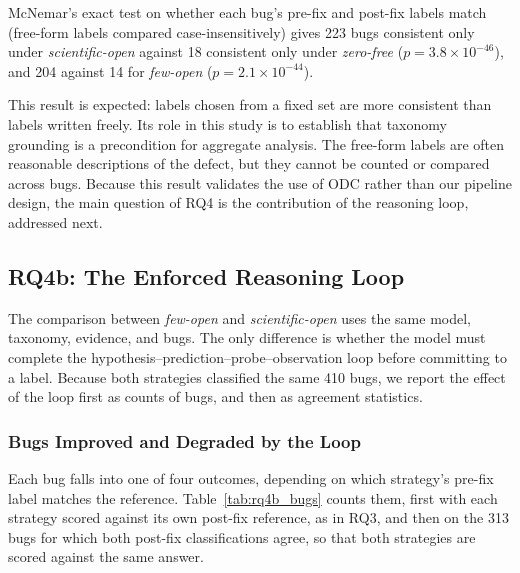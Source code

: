 \documentclass{iutbscthesis}
\begin{document}
McNemar's exact test on whether each bug's pre-fix and post-fix labels match (free-form labels compared case-insensitively) gives 223 bugs consistent only under \textit{scientific-open} against 18 consistent only under \textit{zero-free} ($p = 3.8 \times 10^{-46}$), and 204 against 14 for \textit{few-open} ($p = 2.1 \times 10^{-44}$).

This result is expected: labels chosen from a fixed set are more consistent than labels written freely. Its role in this study is to establish that taxonomy grounding is a precondition for aggregate analysis. The free-form labels are often reasonable descriptions of the defect, but they cannot be counted or compared across bugs. Because this result validates the use of ODC rather than our pipeline design, the main question of RQ4 is the contribution of the reasoning loop, addressed next.

\subsection{RQ4b: The Enforced Reasoning Loop}
\label{sec:rq4b}

The comparison between \textit{few-open} and \textit{scientific-open} uses the same model, taxonomy, evidence, and bugs. The only difference is whether the model must complete the hypothesis--prediction--probe--observation loop before committing to a label. Because both strategies classified the same 410 bugs, we report the effect of the loop first as counts of bugs, and then as agreement statistics.

\subsubsection{Bugs Improved and Degraded by the Loop}

Each bug falls into one of four outcomes, depending on which strategy's pre-fix label matches the reference. Table~\ref{tab:rq4b_bugs} counts them, first with each strategy scored against its own post-fix reference, as in RQ3, and then on the 313 bugs for which both post-fix classifications agree, so that both strategies are scored against the same answer.
\end{document}
